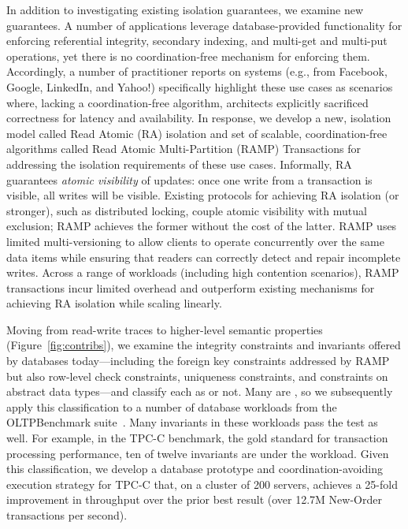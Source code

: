   In addition to investigating existing isolation guarantees, we
  examine new guarantees. A number of applications leverage
  database-provided functionality for enforcing referential integrity,
  secondary indexing, and multi-get and multi-put operations, yet
  there is no coordination-free mechanism for enforcing
  them. Accordingly, a number of practitioner reports on systems
  (e.g., from Facebook, Google, LinkedIn, and Yahoo!) specifically
  highlight these use cases as scenarios where, lacking a
  coordination-free algorithm, architects explicitly sacrificed
  correctness for latency and availability. In response, we develop a
  new, \iconfluent isolation model called Read Atomic (RA) isolation 
  and set of scalable, coordination-free algorithms called Read Atomic
  Multi-Partition (RAMP) Transactions for addressing the isolation
  requirements of these use cases. Informally, RA guarantees
  \textit{atomic visibility} of updates: once one write from a
  transaction is visible, all writes will be visible. Existing
  protocols for achieving RA isolation (or stronger), such as distributed
  locking, couple atomic visibility with mutual exclusion; RAMP
  achieves the former without the cost of the latter. RAMP uses
  limited multi-versioning to allow clients to operate concurrently
  over the same data items while ensuring that readers can correctly
  detect and repair incomplete writes. Across a range of workloads
  (including high contention scenarios), RAMP transactions incur
  limited overhead and outperform existing mechanisms for achieving RA isolation
  while scaling linearly.

   Moving from read-write traces to higher-level semantic
  properties (Figure~\ref{fig:contribs}), we examine the integrity
  constraints and invariants offered by databases today---including
  the foreign key constraints addressed by RAMP but also row-level
  check constraints, uniqueness constraints, and constraints on
  abstract data types---and classify each as \iconfluent or not. Many
  are \iconfluent, so we subsequently apply this classification to a
  number of database workloads from the OLTPBenchmark
  suite~\cite{oltpbench}. Many invariants in these workloads pass the
  \iconfluence test as well. For example, in the TPC-C benchmark, the
  gold standard for transaction processing performance, ten of twelve
  invariants are \iconfluent under the workload. Given this
  classification, we develop a database prototype and
  coordination-avoiding execution strategy for TPC-C that, on a
  cluster of 200 servers, achieves a 25-fold improvement in throughput
  over the prior best result (over 12.7M New-Order transactions per
  second).

